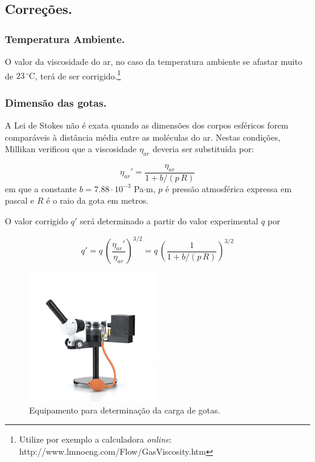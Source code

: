 \documentclass[a4paper,twoside,12pt]{article}      %
\begin{document}
\subsection{\sf Correções.}
\subsubsection{\sf Temperatura Ambiente.}

O valor  da viscosidade do ar, no caso da temperatura ambiente se afastar muito de $23\,^{\circ}\mathrm{C}$, terá de ser corrigido.\footnote{Utilize por exemplo a calculadora \emph{online}: http://www.lmnoeng.com/Flow/GasViscosity.htm}

\subsubsection{\sf Dimensão das gotas.}

A Lei de Stokes não é exata quando as dimensões dos corpos esféricos forem comparáveis à distância média entre as moléculas do ar. Nestas condições, Millikan verificou que a viscosidade $\eta_{ar}$ deveria ser substituída por:

\begin{equation}
	\label{eq:correcao}
	\eta_{ar}' = \frac{\eta_{ar}}{1 + b/(p\,R)}  
\end{equation}
em que a constante $b=7.88\cdot 10^{-3}$ Pa$\cdot$m, 
$p$ é pressão atmosférica expressa em pascal e $R$ é o raio da gota em metros.

O valor corrigido $q'$ será  determinado a partir do valor experimental $q$ por

\begin{equation}
	\label{eq:correcao1}
	q' = q\, \left(\frac{\eta_{ar}'}{\eta_{ar}}\right)^{3/2}  =q\, \left(\frac{1}{1 + b/(p\,R)}\right)^{3/2}  
\end{equation}

\begin{figure}
	[htb]  \centering 
	\includegraphics[width=0.5\textwidth]{./U131001_01_Aparelho-de-Millikan}
	\caption{Equipamento para determinação da carga de gotas. \label{fig:Equi}} 
\end{figure}
\end{document}
